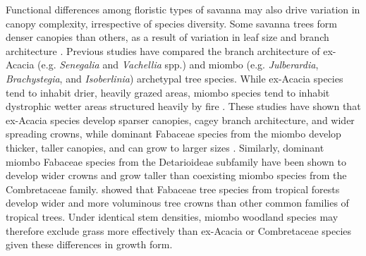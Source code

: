 \begin{refsection}
Functional differences among floristic types of savanna may also drive variation in canopy complexity, irrespective of species diversity. Some savanna trees form denser canopies than others, as a result of variation in leaf size and branch architecture \citep{CharlesDominique2018}. Previous studies have compared the branch architecture of ex-Acacia (e.g. \textit{Senegalia} and \textit{Vachellia} spp.) and miombo (e.g. \textit{Julberardia}, \textit{Brachystegia}, and \textit{Isoberlinia}) archetypal tree species. While ex-Acacia species tend to inhabit drier, heavily grazed areas, miombo species tend to inhabit dystrophic wetter areas structured heavily by fire \citep{Ribeiro2020}. These studies have shown that ex-Acacia species develop sparser canopies, cagey branch architecture, and wider spreading crowns, while dominant Fabaceae species from the miombo develop thicker, taller canopies, and can grow to larger sizes \citep{Mugasha2013, Archibald2003, Privette2004}. Similarly, dominant miombo Fabaceae species from the Detarioideae subfamily have been shown to develop wider crowns and grow taller than coexisting miombo species from the Combretaceae family. \citet{Shenkin2020} showed that Fabaceae tree species from tropical forests develop wider and more voluminous tree crowns than other common families of tropical trees. Under identical stem densities, miombo woodland species may therefore exclude grass more effectively than ex-Acacia or Combretaceae species given these differences in growth form. 


\end{refsection}
